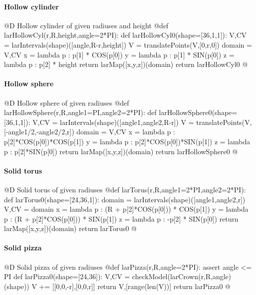 \documentclass[11pt,oneside]{article}	%
\begin{document}
\paragraph{Hollow cylinder}
@D Hollow cylinder of given radiuses and height
@{def larHollowCyl(r,R,height,angle=2*PI):
	def larHollowCyl0(shape=[36,1,1]):
		V,CV = larIntervals(shape)([angle,R-r,height])
		V = translatePoints(V,[0,r,0])
		domain = V,CV
		x = lambda p : p[1] * COS(p[0])
		y = lambda p : p[1] * SIN(p[0])
		z = lambda p : p[2] * height
		return larMap([x,y,z])(domain)
	return larHollowCyl0
@}

\paragraph{Hollow sphere}
@D Hollow sphere of given radiuses
@{def larHollowSphere(r,R,angle1=PI,angle2=2*PI):
	def larHollowSphere0(shape=[36,1,1]):
		V,CV = larIntervals(shape)([angle1,angle2,R-r])
		V = translatePoints(V,[-angle1/2,-angle2/2,r])
		domain = V,CV
		x = lambda p : p[2]*COS(p[0])*COS(p[1])
		y = lambda p : p[2]*COS(p[0])*SIN(p[1])
		z = lambda p : p[2]*SIN(p[0])
		return larMap([x,y,z])(domain)
	return larHollowSphere0
@}


\paragraph{Solid torus}
@D Solid torus of given radiuses
@{def larTorus(r,R,angle1=2*PI,angle2=2*PI):
	def larTorus0(shape=[24,36,1]):
		domain = larIntervals(shape)([angle1,angle2,r])
		V,CV = domain
		x = lambda p : (R + p[2]*COS(p[0])) * COS(p[1])
		y = lambda p : (R + p[2]*COS(p[0])) * SIN(p[1])
		z = lambda p : -p[2] * SIN(p[0])
		return larMap([x,y,z])(domain)
	return larTorus0
@}

\paragraph{Solid pizza}
@D Solid pizza of given radiuses
@{def larPizza(r,R,angle=2*PI):
	assert angle <= PI
	def larPizza0(shape=[24,36]):
		V,CV = checkModel(larCrown(r,R,angle)(shape))
		V += [[0,0,-r],[0,0,r]]
		return V,[range(len(V))]
	return larPizza0
@}
\end{document}
